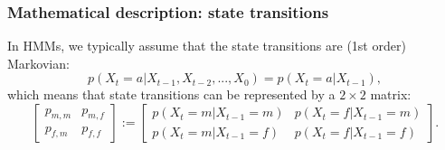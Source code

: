 \documentclass{beamer}
\begin{document}
\begin{frame}
\frametitle{Mathematical description: state transitions}

In HMMs, we typically assume that the state transitions are (1st order) Markovian:
%
\begin{equation}
    p(X_t = a| X_{t-1}, X_{t-2},...,X_0) = p(X_t = a| X_{t-1}),
\end{equation}
%
which means that state transitions can be represented by a $2\times 2$ matrix:
%
\begin{equation}
        \begin{bmatrix} p_{m,m} & p_{m,f}\\ p_{f,m} & p_{f,f} \end{bmatrix} := \begin{bmatrix} p(X_t=m | X_{t-1}=m) & p(X_t=f | X_{t-1}=m) \\ p(X_t=m | X_{t-1}=f) & p(X_t=f | X_{t-1}=f) \end{bmatrix}.
\end{equation}
%
    
\end{frame}
\end{document}
